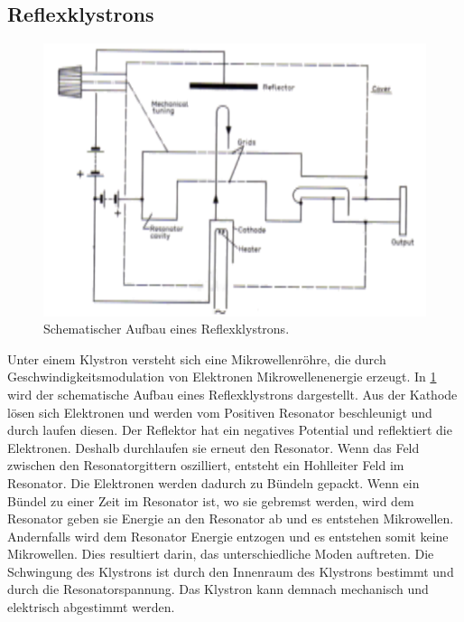 \subsection{Reflexklystrons}
\begin{figure}[h!]
\centering
	\includegraphics[angle = 1 , scale = 0.8]{../Grafiken/Klystron_Schema3.pdf}
	\caption{Schematischer Aufbau eines Reflexklystrons.\cite{V53}}\label{fig:RefKlystron}
\end{figure}
Unter einem Klystron versteht sich eine Mikrowellenröhre, die durch Geschwindigkeitsmodulation von Elektronen Mikrowellenenergie erzeugt. In \cref{fig:RefKlystron} wird der schematische Aufbau eines Reflexklystrons dargestellt. Aus der Kathode lösen sich Elektronen und werden vom Positiven Resonator beschleunigt und durch laufen diesen. Der Reflektor hat ein negatives Potential und reflektiert die Elektronen. Deshalb durchlaufen sie erneut den Resonator. Wenn das Feld zwischen den Resonatorgittern oszilliert, entsteht ein Hohlleiter Feld im Resonator. Die Elektronen werden dadurch zu Bündeln gepackt. Wenn ein Bündel zu einer Zeit im Resonator ist, wo sie gebremst werden, wird dem Resonator geben sie Energie an den Resonator ab und es entstehen Mikrowellen. Andernfalls wird dem Resonator Energie entzogen und es entstehen somit keine Mikrowellen. Dies resultiert darin, das unterschiedliche Moden auftreten. Die Schwingung des Klystrons ist durch den Innenraum des Klystrons bestimmt und durch die Resonatorspannung. Das Klystron kann demnach mechanisch und elektrisch abgestimmt werden.

